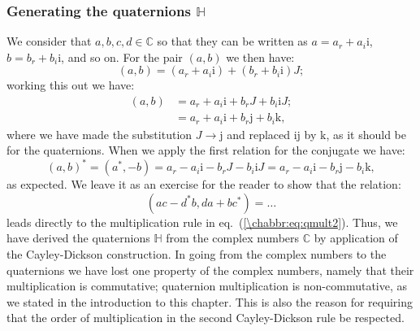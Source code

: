 \subsubsection{Generating the quaternions $\mathbb{H}$}
We consider that $a,b,c,d\in\mathbb{C}$ so that they can be written as $a= a_r+a_i\mathrm{i}$, $b=b_r+b_i\mathrm{i}$, and so on. For the pair $(a,b)$ we then have:
\begin{equation}
	(a,b) = (a_r+a_i\mathrm{i})+(b_r+b_i\mathrm{i})J;
\end{equation}
working this out we have:
\begin{equation}
\begin{split}
	(a,b) &= a_r+a_i\mathrm{i}+b_rJ+b_i\mathrm{i}J;\\
		&= a_r + a_i\mathrm{i}+b_r\mathrm{j}+b_i\mathrm{k},
\end{split}
\end{equation}
where we have made the substitution $J\rightarrow\mathrm{j}$ and replaced $\mathrm{i}\mathrm{j}$ by $\mathrm{k}$, as it should be for the quaternions.  When we apply the first relation for the conjugate we have:
\[
	(a,b)^{\ast} = (a^{\ast},-b)= a_r-a_i\mathrm{i}-b_rJ-b_i\mathrm{i}J=a_r - a_i\mathrm{i}-b_r\mathrm{j}-b_i\mathrm{k},
\]
as expected. We leave it as an exercise for the reader to show that the relation:
\[
	(ac-d^{\ast}b,da+bc^{\ast}) = \ldots
\]
leads directly to the multiplication rule in eq.~(\ref{\chabbr:eq:qmult2}).  Thus, we have derived the quaternions $\mathbb{H}$ from the complex numbers $\mathbb{C}$ by application of the Cayley-Dickson construction.  In going from the complex numbers to the quaternions we have lost one property of the complex numbers, namely that their multiplication is commutative; quaternion multiplication is non-commutative, as we stated in the introduction to this chapter.  This is also the reason for requiring that the order of multiplication in the second Cayley-Dickson rule be respected.

